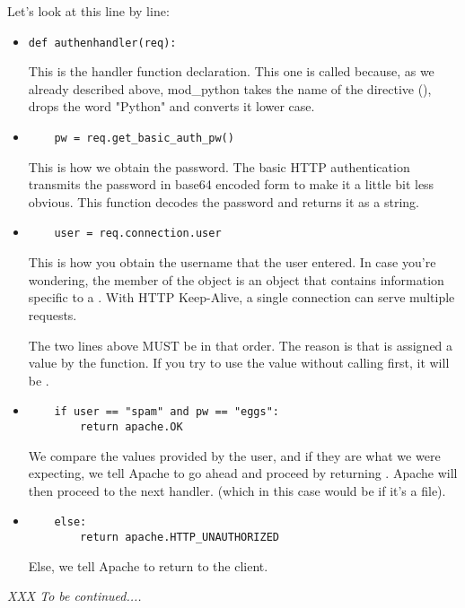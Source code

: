 Let's look at this line by line: 

\begin{itemize}

\item
\begin{verbatim}
def authenhandler(req):
\end{verbatim}

This is the handler function declaration. This one is called
 because, as we already described above, mod_python takes
the name of the directive (), drops the word
"Python" and converts it lower case.

\item
\begin{verbatim}
    pw = req.get_basic_auth_pw()
\end{verbatim}
                  
This is how we obtain the password. The basic HTTP authentication
transmits the password in base64 encoded form to make it a little bit
less obvious. This function decodes the password and returns it as a
string.

\item
\begin{verbatim}
    user = req.connection.user
\end{verbatim}
                  
This is how you obtain the username that the user entered. In case
you're wondering, the  member of the 
object is an object that contains information specific to a
. With HTTP Keep-Alive, a single connection
can serve multiple requests.

 The two lines above MUST be in that order. The reason is that
 is assigned a value by the 
function. If you try to use the  value without calling
 first, it will be .

\item
\begin{verbatim}
    if user == "spam" and pw == "eggs":
        return apache.OK
\end{verbatim}

We compare the values provided by the user, and if they are what we
were expecting, we tell Apache to go ahead and proceed by returning
. Apache will then proceed to the next handler. (which in
this case would be  if it's a  file).

\item
\begin{verbatim}
    else:
        return apache.HTTP_UNAUTHORIZED 
\end{verbatim}

Else, we tell Apache to return  to the client. 

\end{itemize}

\emph{XXX To be continued....}

